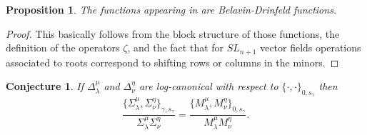 \documentclass[a4paper]{amsart}
\newtheorem{proposition}[theorem]{Proposition}
\newtheorem{conjecture}[theorem]{Conjecture}
\theoremstyle{definition}
\begin{document}
\begin{proposition}
  The functions appearing in \cite{GSV19} are Belavin-Drinfeld functions.
\end{proposition}
\begin{proof}
  This basically follows from the block structure of those functions, the definition of the operators $\zeta$, and the fact that for $SL_{n+1}$ vector fields operations associated to roots correspond to shifting rows or columns in the minors. 
\end{proof}

\begin{conjecture}
  If $\Delta_\lambda^\mu$ and $\Delta_\nu^\eta$ are log-canonical with respect to $\{\cdot,\cdot\}_{0,s_\gamma}$ then
  \[
    \frac{\{\Sigma_\lambda^\mu,\Sigma_\nu^\eta\}_{\gamma,s_\gamma}}{\Sigma_\lambda^\mu \Sigma_\nu^\eta} 
    = 
    \frac{\{M_\lambda^\mu,M_\nu^\eta\}_{0,s_\gamma}}{M_\lambda^\mu M_\nu^\eta}.
  \]
\end{conjecture}
\end{document}
